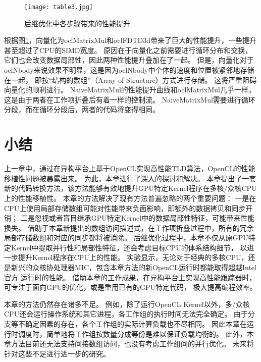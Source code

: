 \begin{figure}[htb]
	\centering
 	\texttt{[image: table3.jpg]}
 	\caption{后继优化中各步骤带来的性能提升}
 	\label{asf}
 \end{figure}

根据图\ref{asf}，向量化为oclMatrixMul和oclFDTD3d带来了巨大的性能提升，一些提升甚至超过了CPU的SIMD宽度。
原因在于向量化之前需要进行循环分布和交换，它们也会改变数据局部性，因此两种性能提升叠加在了一起。
但是，向量化对于oclNbody来说效果不明显，这是因为oclNbody中个体的速度和位置被紧邻地存储在一起，
即按``结构的数组''（Array of Structure）方式进行存储。
这将严重阻碍向量化的顺利进行。
NaiveMatrixMul的性能提升曲线和oclMatrixMul几乎一样，这是由于两者在工作项折叠后有着一样的控制流。
NaiveMatrixMul需要进行循环分段，而在循环分段后，两者的代码将变得相同。

\section{小结}
\label{kernelconclusionsec}
上一章中，通过在异构平台上基于OpenCL实现高性能TLD算法，OpenCL的性能移植性问题被暴露出来。
为此，本章进行了深入的探讨和解决。
本章提出了一套新的代码转换方法，该方法能够有效地提升GPU特定Kernel程序在多核/众核CPU上的性能移植性。
本章的方法解决了现有方法普遍忽略的两个重要问题：
一是在CPU上使用局部存储数组可能对性能带来负面影响，即额外的数据拷贝和同步开销；
二是忽视或者盲目继承GPU特定Kernel中的数据局部性特征，可能带来性能损失。
借助于本章新提出的数组访问描述式，在工作项折叠过程中，所有的冗余局部存储数组和对应的同步都将被消除。
后继优化过程中，本章不仅从原GPU特定Kernel中提取并行性和局部性特征，还会考虑目标CPU的体系结构细节，
以进一步提升Kernel程序在CPU上的性能。
实验显示，无论对于经典的多核CPU，还是新兴的众核协处理器MIC，包含本章方法的新OpenCL运行时都能取得超越Intel官方
运行时的性能。
借助本章的工作成果，在异构平台上实现高性能跟踪器时，可专注于面向GPU的优化，或是重用已有的GPU特定代码，
极大提高编程效率。

本章的方法仍然存在诸多不足。
例如，除了运行OpenCL Kernel以外，多/众核CPU还会运行操作系统和其它进程，各工作组的执行时间无法完全确定。
由于分支等不确定因素的存在，各个工作组的实际计算负载也不尽相同。
因此本章在运行时调度时，简单地将工作组按数量分成等份是难以保证负载均衡的。
此外，本章方法目前还无法支持间接数组访问，也没有考虑工作组间的并行优化。
未来将针对这些不足进行进一步的研究。
 
